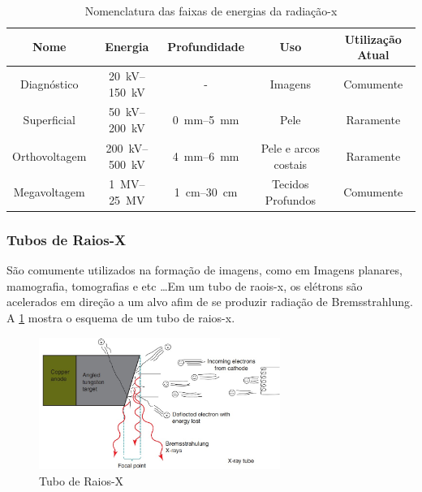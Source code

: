 \documentclass[11pt,a4paper]{article}
\begin{document}
                \begin{table}
                    \centering
                    \caption{Nomenclatura das faixas de energias da radiação-x}
                    \label{tab:nomesRadiacaoX}
                    \begin{tabular}{c c c c c}
                        \hline
                        Nome & Energia & Profundidade & Uso & Utilização Atual \\
                        \hline
                        Diagnóstico & \qtyrange{20}{150}{kV} & - & Imagens & Comumente \\
                        Superficial & \qtyrange{50}{200}{kV} & \qtyrange{0}{5}{mm}  & Pele & Raramente \\
                        Orthovoltagem & \qtyrange{200}{500}{kV} & \qtyrange{4}{6}{mm}  & Pele e arcos costais & Raramente \\
                        Megavoltagem & \qtyrange{1}{25}{MV} & \qtyrange{1}{30}{cm}  & Tecidos Profundos & Comumente \\
                        \hline
                        \hline
                    \end{tabular}
                \end{table}
        
            \subsubsection{Tubos de Raios-X}

                São comumente utilizados na formação de imagens, como em Imagens planares, mamografia, tomografias  e etc \dots Em um tubo de raois-x, os elétrons são acelerados em direção a um alvo afim de se produzir radiação de Bremsstrahlung. A \ref{fig:tuboDeRaiosX} mostra o esquema de um tubo de raios-x.

                    \begin{figure}[h]
                        \centering
                        \includegraphics[width=0.7\textwidth]{Imagens/tuboDeRaiosX.jpg}
                        \caption{Tubo de Raios-X}
                        \label{fig:tuboDeRaiosX}
                    \end{figure}
                
\end{document}

